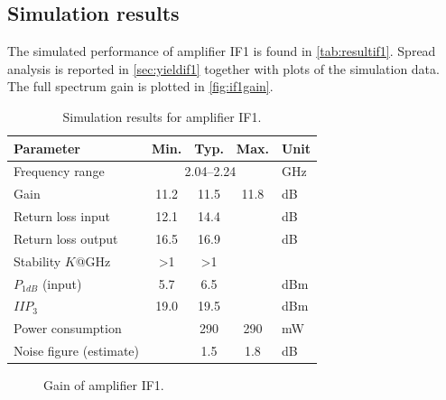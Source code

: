 		\subsection{Simulation results}
			The simulated performance of amplifier IF1 is found in \autoref{tab:resultif1}. Spread analysis is reported in \autoref{sec:yieldif1} together with plots of the simulation data.  The full spectrum gain is plotted in \autoref{fig:if1gain}.
			
			\begin{table}[hbt!]
				\caption[Simulation results for amplifier IF1.]{Simulation results for amplifier IF1.\disclaimer}
				\label{tab:resultif1}
				\centering
				\begin{tabular}{ l c c c l } \toprule
					Parameter & Min. & Typ. & Max. & Unit \\\midrule
					Frequency range & \multicolumn{3}{c}{2.04--2.24} & GHz \\
					Gain & 11.2 & 11.5 & 11.8 & dB \\
					Return loss input & 12.1 & 14.4 &  & dB \\
					Return loss output & 16.5 & 16.9 &  & dB \\
					Stability $K$@\unit[0--80]{GHz} & >1 & >1 &  &  \\
					$P_{1dB}$ (input) & 5.7 & 6.5 &  & dBm \\
					$IIP_3$ & 19.0 & 19.5 &  & dBm \\
					Power consumption &  & 290 & 290 & mW \\
					Noise figure (estimate) &  & 1.5 & 1.8 & dB \\\bottomrule
				\end{tabular}
			\end{table}
			
			\begin{figure}[hbt!]
				\centering
				\caption[Amplifier IF1 gain.]{Gain of amplifier IF1.}\label{fig:if1gain}
			\end{figure}
		

